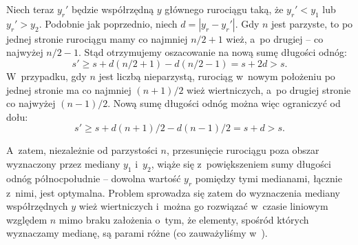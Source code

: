 Niech teraz $y_r'$ będzie współrzędną $y$ głównego rurociągu taką, że $y_r'<y_1$ lub $y_r'>y_2$.
Podobnie jak poprzednio, niech $d=|y_r-y_r'|$.
Gdy $n$ jest parzyste, to po jednej stronie rurociągu mamy co najmniej $n/2+1$ wież, a~po drugiej -- co najwyżej $n/2-1$.
Stąd otrzymujemy oszacowanie na nową sumę długości odnóg:
\[
    s' \ge s+d(n/2+1)-d(n/2-1) = s+2d > s.
\]
W~przypadku, gdy $n$ jest liczbą nieparzystą, rurociąg w~nowym położeniu po jednej stronie ma co najmniej $(n+1)/2$ wież wiertniczych, a~po drugiej stronie co najwyżej $(n-1)/2$.
Nową sumę długości odnóg można więc ograniczyć od dołu:
\[
    s' \ge s+d(n+1)/2-d(n-1)/2 = s+d > s.
\]

A~zatem, niezależnie od parzystości $n$, przesunięcie rurociągu poza obszar wyznaczony przez mediany $y_1$ i~$y_2$, wiąże się z~powiększeniem sumy długości odnóg północ\nbhyphen południe -- dowolna wartość $y_r$ pomiędzy tymi medianami, łącznie z~nimi, jest optymalna.
Problem sprowadza się zatem do wyznaczenia mediany współrzędnych $y$ wież wiertniczych i~można go rozwiązać w~czasie liniowym względem $n$ mimo braku założenia o~tym, że elementy, spośród których wyznaczamy medianę, są parami różne (co zauważyliśmy w~).
